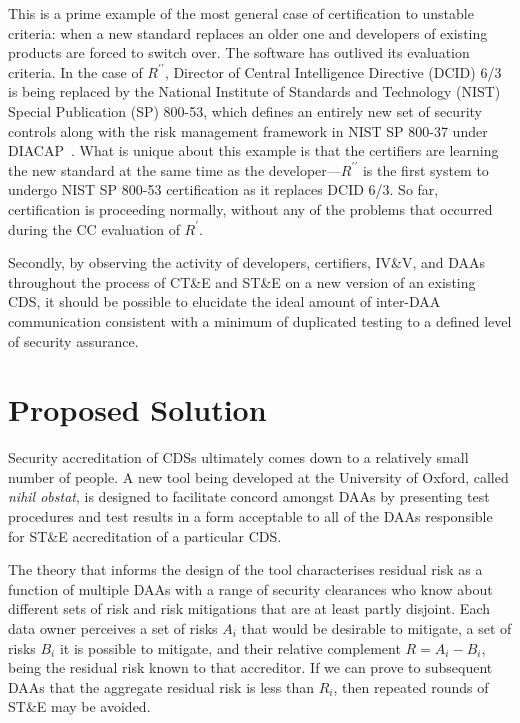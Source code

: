 \documentclass[10pt,letterpaper,conference,compsocconf]{IEEEtran}
\begin{document}
This is a prime example of the most general case of certification to
unstable criteria: when a new standard replaces an older one and
developers of existing products are forced to switch over.
The software has outlived its evaluation criteria.  In the case
of $R^{\prime\prime}$,
Director of Central Intelligence Directive (DCID) 6/3 is being
replaced by the National
Institute of Standards and Technology (NIST) Special Publication
(SP) 800-53, which defines an entirely new set of security
controls along with the risk management framework in
NIST SP 800-37 under
DIACAP~\cite{DCID-6/3a,NIST-SP800-53r3,NIST-SP-800-53A2,NIST-SP-800-37,DIACAP}.
What is unique
about this example is that the certifiers are learning the new
standard at the same time as the developer---$R^{\prime\prime}$
is the first system
to undergo NIST SP 800-53 certification as it replaces DCID 6/3.
So far, certification is proceeding normally, without
any of the problems that occurred during the CC evaluation of
$R^\prime$.

Secondly, by observing the activity of developers, certifiers,
IV\&V, and DAAs throughout the process of CT\&E and ST\&E on a
new version of an existing CDS, it should be possible to elucidate
the ideal amount of inter-DAA communication consistent with a
minimum of duplicated testing to a defined level of security
assurance.

\section{Proposed Solution}\label{solution}

Security accreditation of CDSs ultimately comes down to a relatively
small number of people.  A new tool being developed at the University
of Oxford, called {\it nihil obstat}, is designed to facilitate concord
amongst DAAs by presenting test procedures and test results in a form acceptable
to all of the DAAs responsible for ST\&E accreditation of a particular
CDS.

The theory that informs the design of the tool characterises
residual risk as a function of multiple DAAs with a range of security
clearances who know about different sets of risk and risk
mitigations that are at least partly disjoint.
Each data owner perceives a set of risks $A_i$ that would be desirable
to mitigate, a set of risks $B_i$ it is possible to mitigate, and their
relative complement $R = A_i - B_i$, being the residual risk known to
that accreditor.  If we can prove to subsequent DAAs that the aggregate
residual risk is less than $R_i$, then repeated rounds of ST\&E may be
avoided.
\end{document}
